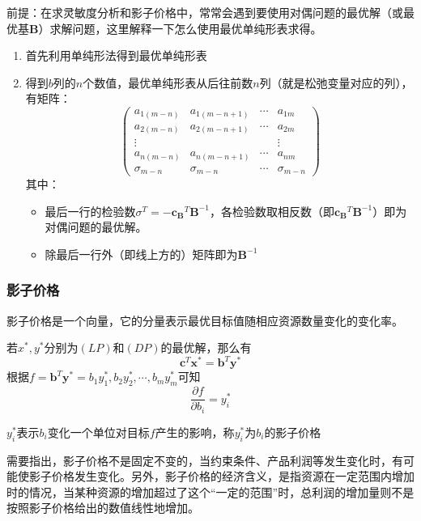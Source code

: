 \documentclass{book}
\begin{document}
前提：在求灵敏度分析和影子价格中，常常会遇到要使用对偶问题的最优解（或最优基$\boldsymbol{B}$）求解问题，这里解释一下怎么使用最优单纯形表求得。

\begin{enumerate}
    \item 首先利用单纯形法得到最优单纯形表
    \item 得到$b$列的$n$个数值，最优单纯形表从后往前数$n$列（就是松弛变量对应的列），有矩阵：$$\begin{pmatrix}
                  a_{1(m-n)}   & a_{1(m-n+1)} & \cdots & a_{1m}       \\
                  a_{2(m-n)}   & a_{2(m-n+1)} & \cdots & a_{2m}       \\
                  \vdots       &              &        & \vdots       \\
                  a_{n(m-n)}   & a_{n(m-n+1)} & \cdots & a_{nm}       \\
                  \hline
                  \sigma_{m-n} & \sigma_{m-n} & \cdots & \sigma_{m-n}
              \end{pmatrix}$$
          其中：
          \begin{itemize}
              \item 最后一行的检验数$\sigma^T =- \boldsymbol{c_B}^T\boldsymbol{B}^{-1}$，各检验数取相反数（即$\boldsymbol{c_B}^T\boldsymbol{B}^{-1}$）即为对偶问题的最优解。
              \item 除最后一行外（即线上方的）矩阵即为$\boldsymbol{B}^{-1}$
          \end{itemize}
\end{enumerate}

\subsubsection{影子价格}

影子价格是一个向量，它的分量表示最优目标值随相应资源数量变化的变化率。

若$x^*, y^*$分别为$(LP)$和$(DP)$的最优解，那么有$$\boldsymbol{c}^T\boldsymbol{x}^*=\boldsymbol{b}^T\boldsymbol{y}^*$$根据$f=\boldsymbol{b}^T\boldsymbol{y}^*=b_1y^*_1, b_2y^*_2, \cdots, b_my^*_m$可知$$\frac{\partial f}{\partial b_i} = y_i^*$$

$y_i^*$表示$b_i$变化一个单位对目标$f$产生的影响，称$y_i^*$为$b_i$的影子价格

需要指出，影子价格不是固定不变的，当约束条件、产品利润等发生变化时，有可能使影子价格发生变化。另外，影子价格的经济含义，是指资源在一定范围内增加时的情况，当某种资源的增加超过了这个“一定的范围”时，总利润的增加量则不是按照影子价格给出的数值线性地增加。
\end{document}
